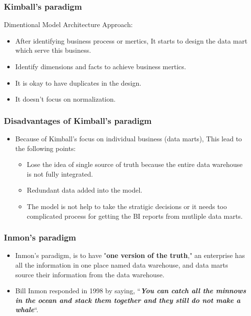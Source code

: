 \begin{frame}
	\frametitle{Kimball's paradigm}
	Dimentional Model Architecture Approach:
	\begin{itemize}[<+->]
		\item After identifying business process or mertics, It starts to design the data mart which serve this business.
		\item Identify dimensions and facts to achieve business mertics.
		\item It is okay to have duplicates in the design.
		\item It doesn't focus on normalization.
	\end{itemize}
	
\end{frame}
\begin{frame}
	\frametitle{Disadvantages of Kimball's paradigm}
	\begin{itemize}
		\item Because of Kimball's focus on individual business (data marts), This lead to the following points:
		\begin{itemize}[<+->]
			\item Lose the idea of single source of truth because the entire data warehouse is not fully integrated.
			\item Redundant data added into the model.
			\item The model is not help to take the stratigic decisions or it needs too complicated process for getting the BI reports from mutliple data marts. 
		\end{itemize}
	\end{itemize}
	
\end{frame}
\begin{frame}
	\frametitle{Inmon's paradigm}
	\begin{itemize}[<+->]
		\item Inmon’s paradigm, is to have "\textbf{one version of the truth}," an enterprise has all the information in one place named data warehouse, and data marts source their information from the data warehouse.
	
		\item Bill Inmon responded in 1998 by saying,  “\textbf{\textit{You can catch all the minnows in the ocean and stack them together and they still do not make a whale}}“. 
	\end{itemize}
	
\end{frame}

